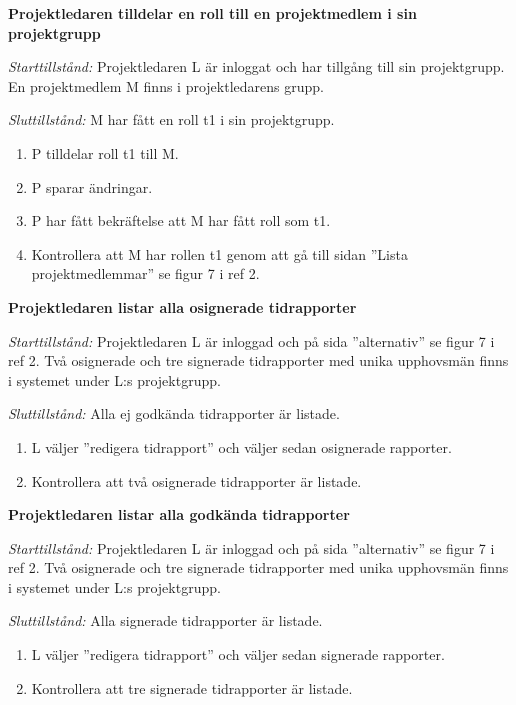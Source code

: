 \documentclass[a4paper]{article}
\begin{document}
\begin{FT}

\item %
\textbf{Projektledaren tilldelar en roll till en projektmedlem i sin projektgrupp}

\emph{Starttillstånd:} Projektledaren L är inloggat och har tillgång till sin projektgrupp. En projektmedlem M finns i projektledarens grupp.

\emph{Sluttillstånd:} M har fått en roll t1 i sin projektgrupp.

\begin{enumerate}
\item P tilldelar roll t1 till M.
\item P sparar ändringar.
\item P har fått bekräftelse att M har fått roll som t1.
\item Kontrollera att M har rollen t1 genom att gå till sidan ''Lista projektmedlemmar'' se figur 7 i ref 2.
\end{enumerate}

\item %
\textbf{Projektledaren listar alla osignerade tidrapporter}

\emph{Starttillstånd:} Projektledaren L är inloggad och på sida ''alternativ'' se figur 7 i ref 2. Två osignerade och tre signerade tidrapporter med unika upphovsmän finns i systemet under L:s projektgrupp.

\emph{Sluttillstånd:} Alla ej godkända tidrapporter är listade.                          

\begin{enumerate}
\item L väljer ''redigera tidrapport'' och väljer sedan osignerade rapporter.
\item Kontrollera att två osignerade tidrapporter är listade.
\end{enumerate}

\item %
\textbf{Projektledaren listar alla godkända tidrapporter}

\emph{Starttillstånd:} Projektledaren L är inloggad och på sida ''alternativ'' se figur 7 i ref 2. Två osignerade och tre signerade tidrapporter med unika upphovsmän finns i systemet under L:s projektgrupp.

\emph{Sluttillstånd:} Alla signerade tidrapporter är listade.                          

\begin{enumerate}
\item L väljer ''redigera tidrapport'' och väljer sedan signerade rapporter.
\item Kontrollera att tre signerade tidrapporter är listade.
\end{enumerate}


\end{FT}
\end{document}
